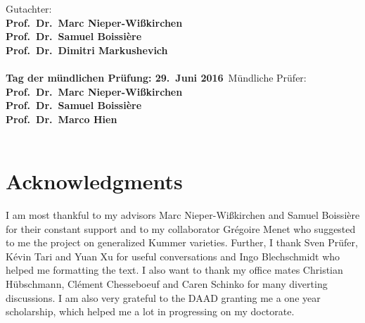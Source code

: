 \documentclass[11pt,twoside]{article}
\begin{document}
\begin{minipage}{240pt}
\vspace{11cm}
Gutachter: \vspace{3pt}\\
\textbf{Prof.~Dr.~Marc Nieper-Wi\ss kirchen}\\
\textbf{Prof.~Dr.~Samuel Boissi\`ere} \\
\textbf{Prof.~Dr.~Dimitri Markushevich} \\
\vspace{18mm}\\
\textbf{Tag der m\"undlichen Pr\"ufung: 29.~Juni 2016}\vspace{2mm}\
M\"undliche Pr\"ufer: \vspace{3pt}\\
\textbf{Prof.~Dr.~Marc Nieper-Wi\ss kirchen}\\
\textbf{Prof.~Dr.~Samuel Boissi\`ere} \\
\textbf{Prof.~Dr.~Marco Hien} \\
\vspace{18mm}\\

\end{minipage}
\cleardoublepage





\section*{Acknowledgments}
I am most thankful to my advisors Marc Nieper-Wi\ss\-kir\-chen and Samuel Boissi\`ere for their constant support
and to my collaborator Gr\'egoire Menet who suggested to me the project on generalized Kummer varieties.
Further, I thank Sven Pr\"ufer, K\'evin Tari and Yuan Xu for useful conversations and
Ingo Blechschmidt who helped me formatting the text.
I also want to thank my office mates Christian H\"ubschmann, Cl\'ement Chesseboeuf and Caren Schinko for many diverting discussions.
I am also very grateful to the DAAD granting me a one year scholarship, which helped me a lot in progressing on my doctorate. 
\end{document}
